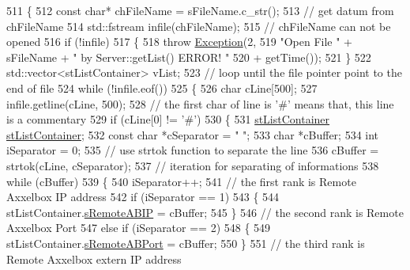 \begin{DoxyCode}
511 \{
512     \textcolor{keyword}{const} \textcolor{keywordtype}{char}* chFileName = sFileName.c\_str();
513     \textcolor{comment}{// get datum from chFileName}
514     std::fstream infile(chFileName);
515     \textcolor{comment}{// chFileName can not be opened}
516     \textcolor{keywordflow}{if} (!infile)
517     \{
518         \textcolor{keywordflow}{throw} \hyperlink{classException}{Exception}(2,
519                 \textcolor{stringliteral}{"Open File "} + sFileName + \textcolor{stringliteral}{" by Server::getList() ERROR! "}
520                         + getTime());
521     \}
522     std::vector<stListContainer> vList;
523     \textcolor{comment}{// loop until the file pointer point to the end of file}
524     \textcolor{keywordflow}{while} (!infile.eof())
525     \{
526         \textcolor{keywordtype}{char} cLine[500];
527         infile.getline(cLine, 500);
528         \textcolor{comment}{// the first char of line is '#' means that, this line is a commentary}
529         \textcolor{keywordflow}{if} (cLine[0] != \textcolor{charliteral}{'#'})
530         \{
531             \hyperlink{structstListContainer}{stListContainer} \hyperlink{structstListContainer}{stListContainer};
532             \textcolor{keyword}{const} \textcolor{keywordtype}{char} *cSeparator = \textcolor{stringliteral}{"   "};
533             \textcolor{keywordtype}{char} *cBuffer;
534             \textcolor{keywordtype}{int} iSeparator = 0;
535             \textcolor{comment}{// use strtok function to separate the line}
536             cBuffer = strtok(cLine, cSeparator);
537             \textcolor{comment}{// iteration for separating of informations}
538             \textcolor{keywordflow}{while} (cBuffer)
539             \{
540                 iSeparator++;
541                 \textcolor{comment}{// the first rank is Remote Axxelbox IP address}
542                 \textcolor{keywordflow}{if} (iSeparator == 1)
543                 \{
544                     stListContainer.\hyperlink{structstListContainer_a2d926770549c1af0e1282f20cdc241e5}{sRemoteABIP} = cBuffer;
545                 \}
546                 \textcolor{comment}{// the second rank is Remote Axxelbox Port}
547                 \textcolor{keywordflow}{else} \textcolor{keywordflow}{if} (iSeparator == 2)
548                 \{
549                     stListContainer.\hyperlink{structstListContainer_ad2a9d2c715866e4fe3a2c588ab3105f0}{sRemoteABPort} = cBuffer;
550                 \}
551                 \textcolor{comment}{// the third rank is Remote Axxelbox extern IP address}

\end{DoxyCode}
